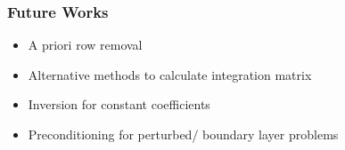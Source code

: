 \documentclass[handout]{beamer}
\begin{document}
\begin{frame}
\frametitle{Future Works}
\begin{itemize}
\item A priori row removal
\item Alternative methods to calculate integration matrix
\item Inversion for constant coefficients
\item Preconditioning for perturbed/ boundary layer problems
\end{itemize}
\end{frame}
\end{document}
